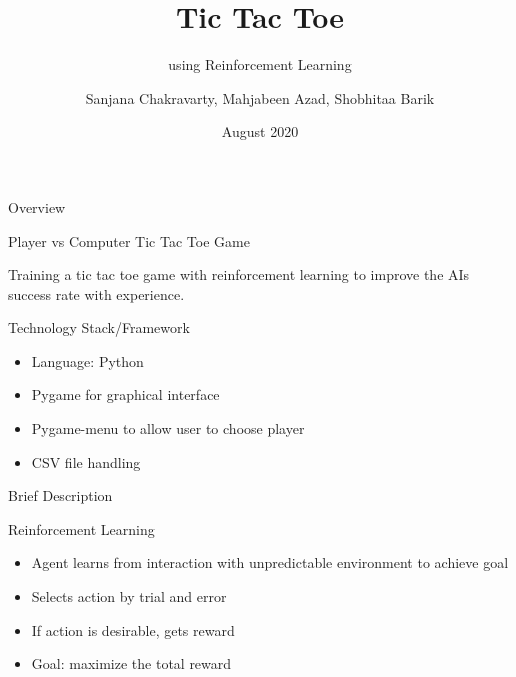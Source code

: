 \documentclass[14pt]{beamer}
\title[WTEF 2020]{Tic Tac Toe}
\subtitle{using Reinforcement Learning}
\author[Group 12]{Sanjana Chakravarty, Mahjabeen Azad, Shobhitaa Barik}
\date{August 2020}
\begin{document}
\begin{frame}
    \titlepage
\end{frame}

\begin{frame}{Overview}
    \begin{center}
        \textcolor{myAmber}{Player vs Computer Tic Tac Toe Game}
    \end{center}
   
    \begin{center}
    Training a tic tac toe game with reinforcement learning to improve the AI\textquotesingle s success rate with experience.
    \end{center}
\end{frame}

\begin{frame}{Technology Stack/Framework}
        \begin{itemize}
            \item Language: Python
            \item Pygame for graphical interface 
            \item Pygame-menu to allow user to choose player
            \item CSV file handling
        \end{itemize}
\end{frame}

\begin{frame}{Brief Description}
    \begin{block}{Reinforcement Learning}        
        \begin{itemize}
            \item<1-> Agent learns from interaction with unpredictable environment to achieve goal
            \item<2-> Selects action by trial and error
            \item<3-> If action is desirable, gets reward
            \item<4-> Goal: maximize the total reward
        \end{itemize}
    \end{block}
\end{frame}
\end{document}
